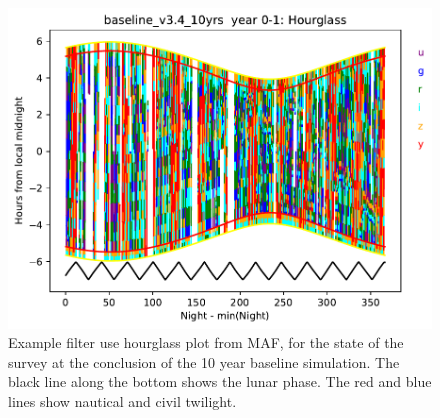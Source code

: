 \begin{figure}[htbp]
\centering
\includegraphics[height=0.4\textheight]{./figures/baseline_v3_4_10yrs_Hourglass_year_0-1_HOUR_Hourglass.pdf}
\caption{\label{fig:orgfd7382a}Example filter use hourglass plot from MAF, for the state of the survey at the conclusion of the 10 year baseline simulation. The black line along the bottom shows the lunar phase. The red and blue lines show nautical and civil twilight.}
\end{figure}

